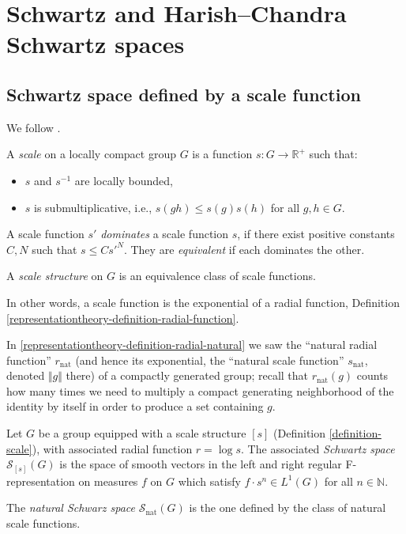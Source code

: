 \section{Schwartz and Harish--Chandra Schwartz spaces}
\label{section-Schwartz}


\subsection{Schwartz space defined by a scale function}
\label{subsection-Schwartz-scale}

We follow \cite[\S 2]{Bernstein-Kroetz}.

\begin{definition}
 \label{definition-scale}
A {\it scale} on a locally compact group $G$ is a function $s : G \to \mathbb R^+$ such that:
\begin{itemize}
 \item $s$ and $s^{-1}$ are locally bounded,
 \item $s$ is submultiplicative, i.e., $s(gh) \le s(g)s(h)$ for all $g, h \in G$.
\end{itemize}

A scale function $s'$ \emph{dominates} a scale function $s$, if there exist positive constants $C, N$ such that $s \le C s'^N$. They are \emph{equivalent} if each dominates the other. 


A {\it scale structure} on $G$ is an equivalence class of scale
functions.
\end{definition}

In other words, a scale function is the exponential of a radial function, Definition \ref{representationtheory-definition-radial-function}.


In \ref{representationtheory-definition-radial-natural} we saw the ``natural radial function'' $r_{\text{nat}}$ (and hence its exponential, the ``natural scale function'' $s_{\text{nat}}$, denoted $\Vert g\Vert$ there) of a compactly generated group; recall that $r_{\text{nat}}(g)$ counts how many times we need to multiply a compact generating neighborhood of the identity by itself in order to produce a set containing $g$. 


\begin{definition}
 \label{definition-Schwartz-space}
Let $G$ be a group equipped with a scale structure $[s]$ (Definition \ref{definition-scale}), with associated radial function $r=\log s$. The associated {\it Schwartz space} $\mathcal S_{[s]}(G)$ is the space of smooth vectors in the left and right regular F-representation on measures $f$ on $G$ which satisfy $f \cdot s^n \in L^1(G)$ for all $n\in \mathbb N$. 

 The {\it natural Schwarz space} $\mathcal S_{\text{nat}}(G)$ is the one defined by the class of natural scale functions. 
\end{definition}

